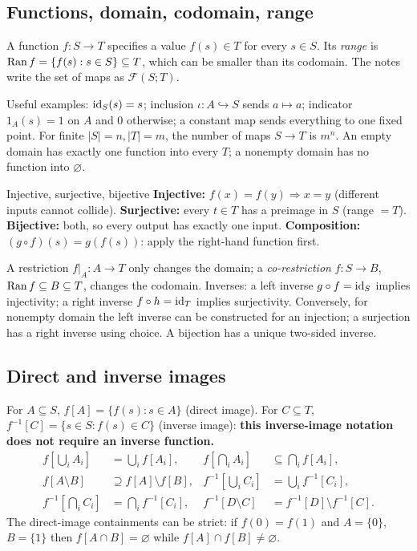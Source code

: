 \documentclass[11pt,a4paper]{article}
\begin{document}
\subsection{Functions, domain, codomain, range}
A function $f:S\to T$ specifies a value $f(s)\in T$ for every $s\in S$. Its \emph{range} is $\operatorname{Ran} f=\{f(s):s\in S\}\subseteq T$, which can be smaller than its codomain. The notes write the set of maps as $\mathcal F(S;T)$.

Useful examples: $\operatorname{id}_S(s)=s$; inclusion $\iota:A\hookrightarrow S$ sends $a\mapsto a$; indicator $1_A(s)=1$ on $A$ and $0$ otherwise; a constant map sends everything to one fixed point. For finite $|S|=n, |T|=m$, the number of maps $S\to T$ is $m^n$. An empty domain has exactly one function into every $T$; a nonempty domain has no function into $\varnothing$.
\begin{keybox}{Injective, surjective, bijective}
\textbf{Injective:} $f(x)=f(y)\Rightarrow x=y$ (different inputs cannot collide). \textbf{Surjective:} every $t\in T$ has a preimage in $S$ (range $=T$). \textbf{Bijective:} both, so every output has exactly one input. \textbf{Composition:} $(g\circ f)(s)=g(f(s))$: apply the right-hand function first.\end{keybox}
A restriction $f|_A:A\to T$ only changes the domain; a \emph{co-restriction} $f:S\to B$, $\operatorname{Ran} f\subseteq B\subseteq T$, changes the codomain. Inverses: a left inverse $g\circ f=\operatorname{id}_S$ implies injectivity; a right inverse $f\circ h=\operatorname{id}_T$ implies surjectivity. Conversely, for nonempty domain the left inverse can be constructed for an injection; a surjection has a right inverse using choice. A bijection has a unique two-sided inverse.
\subsection{Direct and inverse images}
For $A\subseteq S$, $f[A]=\{f(s):s\in A\}$ (direct image). For $C\subseteq T$, $f^{-1}[C]=\{s\in S:f(s)\in C\}$ (inverse image): \textbf{this inverse-image notation does not require an inverse function.}
\begin{align*}f[\bigcup_i A_i]&=\bigcup_i f[A_i],& f[\bigcap_i A_i]&\subseteq\bigcap_i f[A_i],\\ f[A\setminus B]&\supseteq f[A]\setminus f[B],& f^{-1}[\bigcup_i C_i]&=\bigcup_i f^{-1}[C_i],\\ f^{-1}[\bigcap_i C_i]&=\bigcap_i f^{-1}[C_i],& f^{-1}[D\setminus C]&=f^{-1}[D]\setminus f^{-1}[C].\end{align*}
The direct-image containments can be strict: if $f(0)=f(1)$ and $A=\{0\}$, $B=\{1\}$ then $f[A\cap B]=\varnothing$ while $f[A]\cap f[B]\ne\varnothing$.
\end{document}
